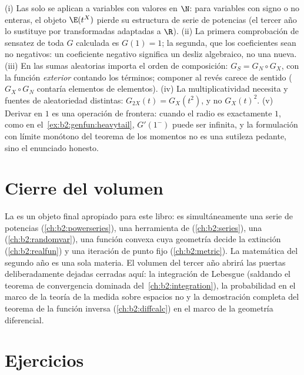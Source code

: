 \begin{remark}
(i) Las  solo se aplican a variables con
valores en $\N$: para variables con signo o no enteras, el objeto
$\E(t^X)$ pierde su estructura de serie de potencias (el tercer año
lo sustituye por transformadas adaptadas a $\R$). (ii) La primera
comprobación de sensatez de toda $G$ calculada es $G(1) = 1$; la
segunda, que los coeficientes sean no negativos: un coeficiente
negativo significa un desliz algebraico, no una  nueva. (iii) En
las sumas aleatorias importa el orden de composición: $G_S = G_N
\circ G_X$, con la función \emph{exterior} contando los términos;
componer al revés carece de sentido ($G_X \circ G_N$ contaría
elementos de elementos). (iv) La multiplicatividad necesita
 y fuentes de aleatoriedad distintas: $G_{2X}(t) =
G_X(t^2)$, y no $G_X(t)^2$. (v) Derivar en $1$ es una operación de
frontera: cuando el radio es exactamente $1$, como en el~\cref{ex:b2:genfun:heavytail}, $G'(1^-)$ puede ser infinita, y la
formulación con límite monótono del teorema de los momentos no es una
sutileza pedante, sino el enunciado honesto.
\end{remark}

\section*{Cierre del volumen}

La  es un objeto final apropiado para este libro:
es simultáneamente una serie de potencias (\cref{ch:b2:powerseries}),
una herramienta de  (\cref{ch:b2:series}), una
 (\cref{ch:b2:randomvar}), una función convexa cuya geometría
decide la extinción (\cref{ch:b2:realfun}) y una iteración de punto
fijo (\cref{ch:b2:metric}). La matemática del segundo año es una sola
materia. El volumen del tercer año abrirá las puertas deliberadamente
dejadas cerradas aquí: la integración de Lebesgue (saldando el teorema
de convergencia dominada del~\cref{ch:b2:integration}), la
probabilidad en el marco de la teoría de la medida sobre espacios no
 y la demostración completa del teorema de la función
inversa (\cref{ch:b2:diffcalc}) en el marco de la geometría
diferencial.

\section{Ejercicios}

